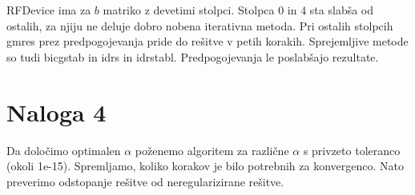\documentclass{article}
\begin{document}
    RFDevice ima za \(b\) matriko z devetimi stolpci. Stolpca \(0\) in \(4\) sta slabša od ostalih, za njiju ne deluje dobro nobena iterativna metoda. Pri ostalih stolpcih gmres prez predpogojevanja pride do rešitve v petih korakih. Sprejemljive metode so tudi bicgstab in idrs in idrstabl. Predpogojevanja le poslabšajo rezultate.




    \section{Naloga 4}
    Da določimo optimalen \(\alpha\) poženemo algoritem za različne \(\alpha\) s privzeto toleranco (okoli 1e-15). Spremljamo, koliko korakov je bilo potrebnih za konvergenco. Nato preverimo odstopanje rešitve od neregularizirane rešitve.
\end{document}
